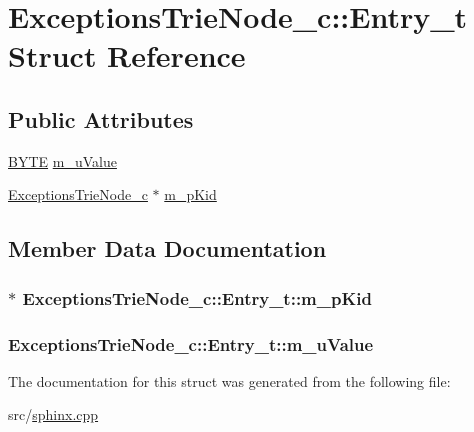 \hypertarget{structExceptionsTrieNode__c_1_1Entry__t}{\section{Exceptions\-Trie\-Node\-\_\-c\-:\-:Entry\-\_\-t Struct Reference}
\label{structExceptionsTrieNode__c_1_1Entry__t}
}
\subsection*{Public Attributes}
\begin{DoxyCompactItemize}
\item 
\hyperlink{sphinxstd_8h_a4ae1dab0fb4b072a66584546209e7d58}{B\-Y\-T\-E} \hyperlink{structExceptionsTrieNode__c_1_1Entry__t_aa8160f1b003ec661fac151de4e908213}{m\-\_\-u\-Value}
\item 
\hyperlink{classExceptionsTrieNode__c}{Exceptions\-Trie\-Node\-\_\-c} $\ast$ \hyperlink{structExceptionsTrieNode__c_1_1Entry__t_a9eb55b92f4dbc2c8d703aa0503a68232}{m\-\_\-p\-Kid}
\end{DoxyCompactItemize}


\subsection{Member Data Documentation}
\hypertarget{structExceptionsTrieNode__c_1_1Entry__t_a9eb55b92f4dbc2c8d703aa0503a68232}{
\subsubsection[{m\-\_\-p\-Kid}]{$\ast$ Exceptions\-Trie\-Node\-\_\-c\-::\-Entry\-\_\-t\-::m\-\_\-p\-Kid}}\label{structExceptionsTrieNode__c_1_1Entry__t_a9eb55b92f4dbc2c8d703aa0503a68232}
\hypertarget{structExceptionsTrieNode__c_1_1Entry__t_aa8160f1b003ec661fac151de4e908213}{
\subsubsection[{m\-\_\-u\-Value}]{ Exceptions\-Trie\-Node\-\_\-c\-::\-Entry\-\_\-t\-::m\-\_\-u\-Value}}\label{structExceptionsTrieNode__c_1_1Entry__t_aa8160f1b003ec661fac151de4e908213}


The documentation for this struct was generated from the following file\-:\begin{DoxyCompactItemize}
\item 
src/\hyperlink{sphinx_8cpp}{sphinx.\-cpp}\end{DoxyCompactItemize}
